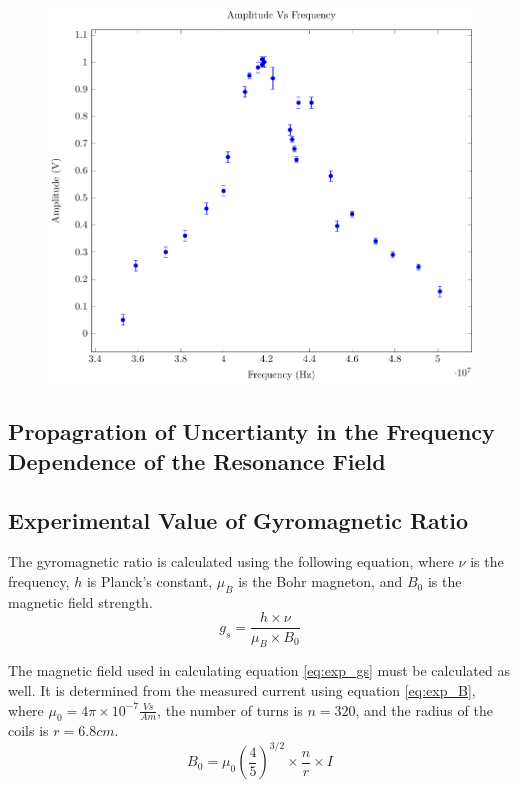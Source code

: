 \documentclass[a4paper]{article}
\begin{document}
\begin{figure}[H]
\centering
\includegraphics[scale=1.0]{Plots/ExpFreqVsVolt/freq_depen.pdf}
\label{FrequencyDependence}
\end{figure}

\subsection{Propagration of Uncertianty in the Frequency Dependence of the Resonance Field}

\subsection{Experimental Value of Gyromagnetic Ratio}
\qq The gyromagnetic ratio is calculated using the following equation, where $\nu$ is the frequency, $h$ is Planck's constant, $\mu_B$ is the Bohr magneton, and $B_0$ is the magnetic field strength.
\begin{equation}
\label{eq:exp_gs}
g_s = \frac{h \times \nu}{\mu_B \times B_0}
\end{equation} 

\qq The magnetic field used in calculating equation \ref{eq:exp_gs} must be calculated as well. It is determined from the measured current using equation \ref{eq:exp_B}, where $\mu_0 = 4 \pi \times 10^{-7} \frac{Vs}{Am}$, the number of turns is $n=320$, and the radius of the coils is $r=6.8cm$.
\begin{equation}
\label{eq:exp_B}
B_0 = \mu_0 \left( \frac{4}{5} \right) ^{3/2} \times \frac{n}{r} \times I
\end{equation}
\end{document}
